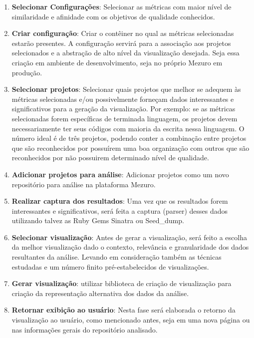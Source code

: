 \begin{enumerate}
  \item \textbf{Selecionar Configurações}: Selecionar as métricas com maior nível de
  similaridade e afinidade com os objetivos de qualidade conhecidos.

  \item \textbf{Criar configuração}: Criar o contêiner no qual as métricas
  selecionadas estarão presentes. A configuração servirá para a associação aos
  projetos selecionados e a abstração de alto nível da visualização desejada.
  Seja essa criação em ambiente de desenvolvimento, seja no próprio Mezuro em
  produção.

  \item \textbf{Selecionar projetos}: Selecionar quais projetos que melhor se
  adequem às métricas selecionadas e/ou possivelmente forneçam dados
  interessantes e significativos para a geração da visualização. Por exemplo:
  se as métricas selecionadas forem específicas de terminada linguagem, os
  projetos devem necessariamente ter seus códigos com maioria da escrita
  nessa linguagem. O número ideal é de três projetos, podendo conter a
  combinação entre projetos que são reconhecidos por possuírem uma boa
  organização com outros que são reconhecidos por não possuirem determinado
  nível de qualidade.

  \item \textbf{Adicionar projetos para análise}: Adicionar projetos como um
  novo repositório para análise na plataforma Mezuro.

  \item \textbf{Realizar captura dos resultados}: Uma vez que os resultados
  forem interessantes e significativos, será feita a captura (parser) desses
  dados utilizando talvez as Ruby Gems Sinatra ou Seed\_dump.

  \item \textbf{Selecionar visualização}: Antes de gerar a visualização, será
  feito a escolha da melhor visualização dado o contexto, relevância e
  granularidade dos dados resultantes da análise. Levando em consideração também
  as técnicas estudadas e um número finito pré-estabelecidos de visualizações.

  \item \textbf{Gerar visualização}: utilizar biblioteca de criação de
  visualização para criação da representação alternativa dos dados da análise.

  \item \textbf{Retornar exibição ao usuário}: Nesta fase será elaborada o
  retorno da visualização ao usuário, como mencionado antes, seja em uma nova
  página ou nas informações gerais do repositório analisado.
\end{enumerate}

